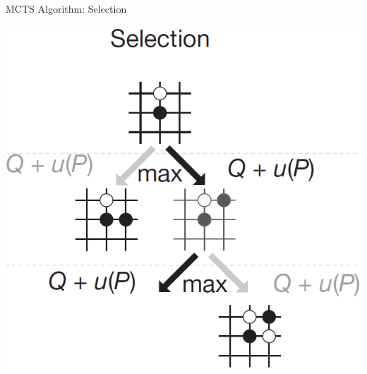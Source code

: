 \documentclass{beamer}
\begin{document}
{    \begin{frame}{MCTS Algorithm: Selection}
      \begin{center}
        \includegraphics[height=.6\textheight]{../img/MCTS_selection.png}
      \end{center}
    \end{frame}

}
\end{document}
